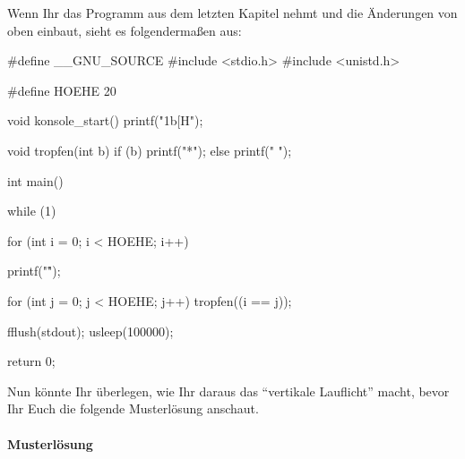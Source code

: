 \newpage
Wenn Ihr das Programm aus dem letzten Kapitel nehmt und die Änderungen von oben einbaut, sieht es folgendermaßen aus:
\begin{code}[numbers=none]
#define __GNU_SOURCE
#include <stdio.h>
#include <unistd.h>

#define HOEHE 20

void konsole_start() { 
    printf("\x1b[H"); 
}

void tropfen(int b) {
    if (b)
        printf("*");
    else
        printf(" ");
}

int main() {
    while (1) {
        for (int i = 0; i < HOEHE; i++) {
            printf("\r");

            for (int j = 0; j < HOEHE; j++) {
                tropfen((i == j));
            }

            fflush(stdout);
            usleep(100000);
        }
    }

    return 0;
}
\end{code}
Nun könnte Ihr überlegen, wie Ihr daraus das ``vertikale Lauflicht'' macht, bevor Ihr Euch die folgende Musterlösung anschaut.

\newpage
\paragraph{Musterlösung}


